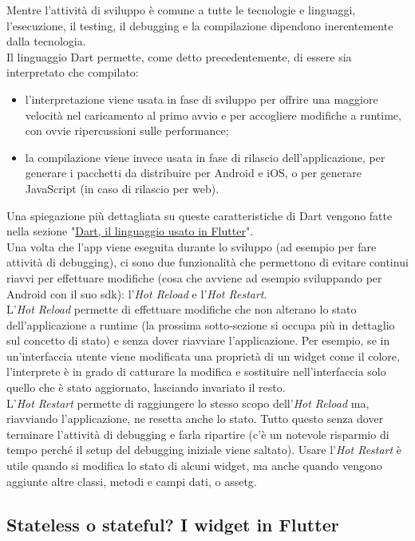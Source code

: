 Mentre l'attività di sviluppo è comune a tutte le tecnologie e linguaggi, l'esecuzione, il testing, il debugging e la compilazione dipendono inerentemente dalla tecnologia.\\
Il linguaggio Dart permette, come detto precedentemente, di essere sia interpretato che compilato:
\begin{itemize}
    \item l'interpretazione viene usata in fase di sviluppo per offrire una maggiore velocità nel caricamento al primo avvio e per accogliere modifiche a runtime, con ovvie ripercussioni sulle performance;
    \item la compilazione viene invece usata in fase di rilascio dell'applicazione, per generare i pacchetti da distribuire per Android e iOS, o per generare JavaScript (in caso di rilascio per web).
\end{itemize}
Una spiegazione più dettagliata su queste caratteristiche di Dart vengono fatte nella sezione "\hyperref[sec:linguaggio-dart]{Dart, il linguaggio usato in Flutter}".\\
Una volta che l'app viene eseguita durante lo sviluppo (ad esempio per fare attività di debugging), ci sono due funzionalità che permettono di evitare continui riavvi per effettuare modifiche (cosa che avviene ad esempio sviluppando per Android con il suo \gls{sdk}): l'\emph{Hot Reload} e l'\emph{Hot Restart}.\\
L'\emph{Hot Reload} permette di effettuare modifiche che non alterano lo stato dell'applicazione a runtime (la prossima sotto-sezione si occupa più in dettaglio sul concetto di stato) e senza dover riavviare l'applicazione.
Per esempio, se in un'interfaccia utente viene modificata una proprietà di un widget come il colore, l'interprete è in grado di catturare la modifica e sostituire nell'interfaccia solo quello che è stato aggiornato, lasciando invariato il resto.\\
L'\emph{Hot Restart} permette di raggiungere lo stesso scopo dell'\emph{Hot Reload} ma, riavviando l'applicazione, ne resetta anche lo stato.
Tutto questo senza dover terminare l'attività di debugging e farla ripartire (c'è un notevole risparmio di tempo perché il setup del debugging iniziale viene saltato).
Usare l'\emph{Hot Restart} è utile quando si modifica lo stato di alcuni widget, ma anche quando vengono aggiunte altre classi, metodi e campi dati, o \gls{assetg}.

\subsection{Stateless o stateful? I widget in Flutter}
\label{subsec:stateless-stateful}

